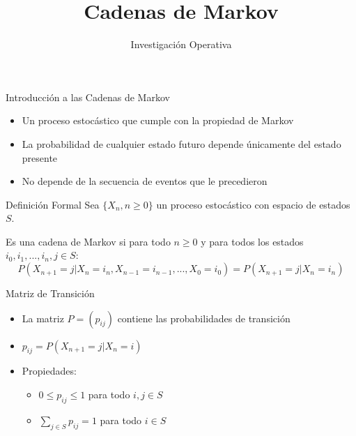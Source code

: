 \documentclass{beamer}
\title{\Huge\textbf{Cadenas de Markov}}
\author{Investigación Operativa}
\date{}
\begin{document}
\begin{frame}
    \titlepage
\end{frame}

\begin{frame}{Introducción a las Cadenas de Markov}
    \begin{itemize}
        \item<1-> Un proceso estocástico que cumple con la propiedad de Markov
        \item<2-> La probabilidad de cualquier estado futuro depende únicamente del estado presente
        \item<3-> No depende de la secuencia de eventos que le precedieron
    \end{itemize}
\end{frame}

\begin{frame}{Definición Formal}
    Sea $\{X_n, n \geq 0\}$ un proceso estocástico con espacio de estados $S$.
    
    Es una cadena de Markov si para todo $n \geq 0$ y para todos los estados $i_0, i_1, ..., i_n, j \in S$:
    \[P(X_{n+1} = j | X_n = i_n, X_{n-1} = i_{n-1}, ..., X_0 = i_0) = P(X_{n+1} = j | X_n = i_n)\]
\end{frame}

\begin{frame}{Matriz de Transición}
    \begin{itemize}
        \item La matriz $P = (p_{ij})$ contiene las probabilidades de transición
        \item $p_{ij} = P(X_{n+1} = j | X_n = i)$
        \item<+-> Propiedades:
        \begin{itemize}
            \item $0 \leq p_{ij} \leq 1$ para todo $i,j \in S$
            \item $\sum_{j \in S} p_{ij} = 1$ para todo $i \in S$
        \end{itemize}
    \end{itemize}
\end{frame}
\end{document}

